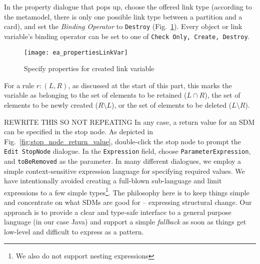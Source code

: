 In the property dialogue that pops up, choose the offered link type (according to the metamodel, there is only one possible link type between a partition and a
 card), and set the \emph{Binding Operator} to \texttt{Destroy} (Fig.~\ref{fig:link_variable_properties}). Every object or link
variable's binding operator can be set to one of \texttt{Check Only, Create, Destroy}.

\begin{figure}[htp]
\begin{center} 
 \texttt{[image: ea\_propertiesLinkVar]}
  \caption{Specify properties for created link variable}  
  \label{fig:link_variable_properties}
\end{center}
\end{figure}


For a rule $r: (L, R)$, as discussed at the start of this part, this marks the variable as belonging to the set of elements to be retained ($L\cap R$), the
set of elements to be newly created ($R\setminus L$), or the set of elements to be deleted ($L\setminus R$).
 
REWRITE THIS SO NOT REPEATING
In any case, a return value for an SDM can be specified in the stop node. As depicted in Fig.~\ref{fig:stop_node_return_value}, double-click the stop node to
prompt the \texttt{Edit StopNode} dialogue. In the \texttt{Expression} field, choose \texttt{ParameterExpression}, and \texttt{toBeRemoved} as the parameter. In
many different dialogues, we employ a simple context-sensitive expression language for specifying required values. We have intentionally avoided creating a
full-blown sub-language and limit expressions to a few simple types\footnote{We also do not support nesting expressions}.
The philosophy here is to keep things simple and concentrate on what SDMs are good for -- expressing structural change.
Our approach is to provide a clear and type-safe interface to a general purpose language (in our case Java) and support a simple \emph{fallback} as soon as
things get low-level and difficult to express as a pattern.

